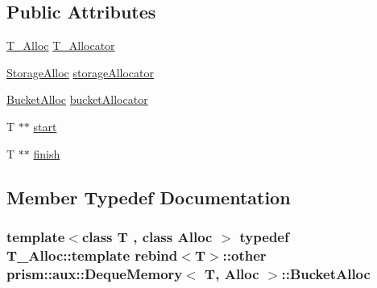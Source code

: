 \subsection*{Public Attributes}
\begin{DoxyCompactItemize}
\item 
\hyperlink{structprism_1_1aux_1_1_deque_memory_ae51ea3bab8a3bb39d82eb9032396b980}{T\+\_\+\+Alloc} \hyperlink{structprism_1_1aux_1_1_deque_memory_ac2785bd032610f17d9e7e5aee422ff60}{T\+\_\+\+Allocator}
\item 
\hyperlink{structprism_1_1aux_1_1_deque_memory_ac314b95624792862b1c97ea15e5bffd5}{Storage\+Alloc} \hyperlink{structprism_1_1aux_1_1_deque_memory_a4aa5eb83afed81aab8a6031c02114252}{storage\+Allocator}
\item 
\hyperlink{structprism_1_1aux_1_1_deque_memory_a06ddbfbcfbfb11f94d53cd8cc9942044}{Bucket\+Alloc} \hyperlink{structprism_1_1aux_1_1_deque_memory_a7f3385f8ccbc39a7ae64eff752fc00a1}{bucket\+Allocator}
\item 
T $\ast$$\ast$ \hyperlink{structprism_1_1aux_1_1_deque_memory_aa7e9880e7681523029c4d7664d7743f2}{start}
\item 
T $\ast$$\ast$ \hyperlink{structprism_1_1aux_1_1_deque_memory_abc882c56fe6797c766bea89924801020}{finish}
\end{DoxyCompactItemize}


\subsection{Member Typedef Documentation}
\subsubsection[{\texorpdfstring{Bucket\+Alloc}{BucketAlloc}}]{\setlength{\rightskip}{0pt plus 5cm}template$<$class T , class Alloc $>$ typedef T\+\_\+\+Alloc\+::template rebind$<$T$>$\+::other {\bf prism\+::aux\+::\+Deque\+Memory}$<$ T, Alloc $>$\+::{\bf Bucket\+Alloc}}\hypertarget{structprism_1_1aux_1_1_deque_memory_a06ddbfbcfbfb11f94d53cd8cc9942044}{}\label{structprism_1_1aux_1_1_deque_memory_a06ddbfbcfbfb11f94d53cd8cc9942044}
